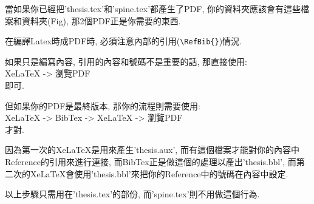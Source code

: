 當如果你已經把'thesis.tex'和'spine.tex'都產生了PDF, 你的資料夾應該會有這些檔案和資料夾(Fig), 那2個PDF正是你需要的東西.



\newpage
{}

在編譯Latex時成PDF時, 必須注意內部的引用(\verb|\RefBib{}|)情況.

如果只是編寫內容, 引用的內容和號碼不是重要的話, 那直接使用:\\
XeLaTeX -> 瀏覽PDF\\
即可.

但如果你的PDF是最終版本, 那你的流程則需要使用:\\
XeLaTeX -> BibTex -> XeLaTeX -> 瀏覽PDF\\
才對.

因為第一次的XeLaTeX是用來產生'thesis.aux', 而有這個檔案才能對你的內容中Reference的引用來進行連接, 而BibTex正是做這個的處理以產出'thesis.bbl', 而第二次的XeLaTeX會使用'thesis.bbl'來把你的Reference中的號碼在內容中設定.

以上步驟只需用在'thesis.tex'的部份, 而'spine.tex'則不用做這個行為.

